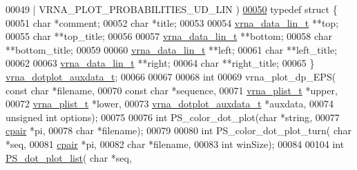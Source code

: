\begin{DoxyCode}
00049 \textcolor{preprocessor}{                                            | VRNA\_PLOT\_PROBABILITIES\_UD\_LIN )}
\hypertarget{PS__dot_8h_source.tex_l00050}{}\hyperlink{structvrna__dotplot__auxdata__t}{00050} \textcolor{keyword}{typedef} \textcolor{keyword}{struct }\{
00051   \textcolor{keywordtype}{char}            *comment;
00052   \textcolor{keywordtype}{char}            *title;
00053 
00054   \hyperlink{group__data__structures_structvrna__data__linear__s}{vrna\_data\_lin\_t} **top;
00055   \textcolor{keywordtype}{char}            **top\_title;
00056 
00057   \hyperlink{group__data__structures_structvrna__data__linear__s}{vrna\_data\_lin\_t} **bottom;
00058   \textcolor{keywordtype}{char}            **bottom\_title;
00059 
00060   \hyperlink{group__data__structures_structvrna__data__linear__s}{vrna\_data\_lin\_t} **left;
00061   \textcolor{keywordtype}{char}            **left\_title;
00062 
00063   \hyperlink{group__data__structures_structvrna__data__linear__s}{vrna\_data\_lin\_t} **right;
00064   \textcolor{keywordtype}{char}            **right\_title;
00065 \} \hyperlink{structvrna__dotplot__auxdata__t}{vrna\_dotplot\_auxdata\_t};
00066 
00067 
00068 \textcolor{keywordtype}{int}
00069 vrna\_plot\_dp\_EPS( \textcolor{keyword}{const} \textcolor{keywordtype}{char}              *filename,
00070                   \textcolor{keyword}{const} \textcolor{keywordtype}{char}              *sequence,
00071                   \hyperlink{group__data__structures_structvrna__plist__s}{vrna\_plist\_t}            *upper,
00072                   \hyperlink{group__data__structures_structvrna__plist__s}{vrna\_plist\_t}            *lower,
00073                   \hyperlink{structvrna__dotplot__auxdata__t}{vrna\_dotplot\_auxdata\_t}  *auxdata,
00074                   \textcolor{keywordtype}{unsigned} \textcolor{keywordtype}{int}            options);
00075 
00076 \textcolor{keywordtype}{int} PS\_color\_dot\_plot(\textcolor{keywordtype}{char} *\textcolor{keywordtype}{string},
00077                       \hyperlink{group__data__structures_structvrna__cpair__s}{cpair} *pi,
00078                       \textcolor{keywordtype}{char} *filename);
00079 
00080 \textcolor{keywordtype}{int} PS\_color\_dot\_plot\_turn( \textcolor{keywordtype}{char} *seq,
00081                             \hyperlink{group__data__structures_structvrna__cpair__s}{cpair} *pi,
00082                             \textcolor{keywordtype}{char} *filename,
00083                             \textcolor{keywordtype}{int} winSize);
00084 
00104 \textcolor{keywordtype}{int} \hyperlink{group__plotting__utils_ga00ea223b5cf02eb2faae5ff29f0d5e12}{PS\_dot\_plot\_list}( \textcolor{keywordtype}{char} *seq,

\end{DoxyCode}
